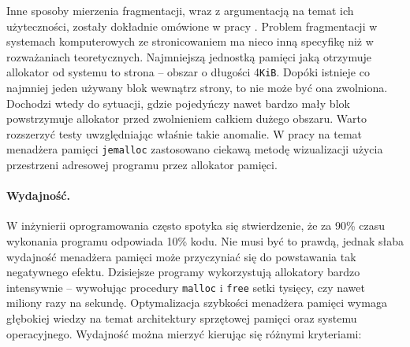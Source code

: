 \documentclass[12pt,a4paper,titlepage,twoside]{mwart}
\begin{document}
Inne sposoby mierzenia fragmentacji, wraz z argumentacją na temat ich
użyteczności, zostały dokładnie omówione w pracy \cite{johnstone98memory}.
Problem fragmentacji w systemach komputerowych ze stronicowaniem ma nieco inną
specyfikę niż w rozważaniach teoretycznych. Najmniejszą jednostką pamięci jaką
otrzymuje allokator od systemu to strona -- obszar o długości 4\texttt{KiB}.
Dopóki istnieje co najmniej jeden używany blok wewnątrz strony, to nie może być
ona zwolniona.  Dochodzi wtedy do sytuacji, gdzie pojedyńczy nawet bardzo mały
blok powstrzymuje allokator przed zwolnieniem całkiem dużego obszaru. Warto
rozszerzyć testy uwzględniając właśnie takie anomalie. W pracy na temat
menadżera pamięci \texttt{jemalloc} \cite{evans06scalable} zastosowano ciekawą
metodę wizualizacji użycia przestrzeni adresowej programu przez allokator
pamięci.

\paragraph{Wydajność.} W inżynierii oprogramowania często spotyka się
stwierdzenie, że za 90\% czasu wykonania programu odpowiada 10\% kodu. Nie musi
być to prawdą, jednak słaba wydajność menadżera pamięci może przyczyniać się do
powstawania tak negatywnego efektu. Dzisiejsze programy wykorzystują allokatory
bardzo intensywnie -- wywołując procedury \texttt{malloc} i \texttt{free} setki
tysięcy, czy nawet miliony razy na sekundę. Optymalizacja szybkości menadżera
pamięci wymaga głębokiej wiedzy na temat architektury sprzętowej pamięci oraz
systemu operacyjnego. Wydajność można mierzyć kierując się różnymi kryteriami:
\end{document}
